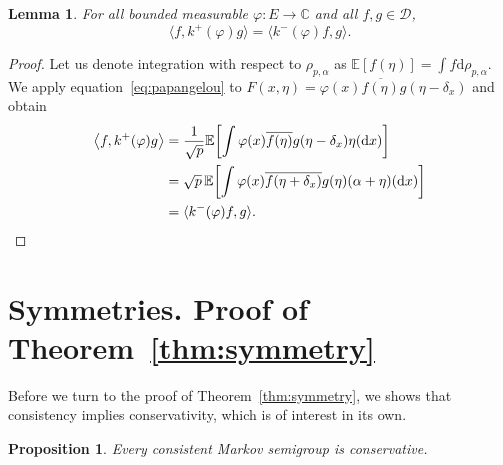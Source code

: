 \documentclass[pdftex]{sigma}
\numberwithin{equation}{section}
\newtheorem{Lemma}[Theorem]{Lemma}
\newtheorem{Proposition}[Theorem]{Proposition}
 { \theoremstyle{definition}
\newtheorem{Definition}[Theorem]{Definition}
\newtheorem{Example}[Theorem]{Example}
\newtheorem{Remark}[Theorem]{Remark}
}
\newcommand{\C}{\mathbb{C}}
\newcommand{\E}{\mathbb{E}}
\newcommand{\dd}{\mathrm{d}} %
\newcommand{\1}{\mathbbm{1}}
\begin{document}
\begin{Lemma} \label{lem:adjoints}
	For all bounded measurable $\varphi\colon E\to \C$ and all $f,g\in \mathcal D$,
	\[
		\bigl\langle f, k^+(\varphi) g\bigr\rangle = \langle k^-(\varphi) f,g \rangle.
	\]
\end{Lemma}

\begin{proof}	
	Let us denote integration with respect to $\rho_{p,\alpha}$ as $\E[f(\eta)] =\int f\dd \rho_{p,\alpha}$. We apply equation~\eqref{eq:papangelou} to $F(x,\eta) = \varphi(x) \overline{f(\eta)} g(\eta - \delta_x)$ and obtain
	\begin{align*}
		\bigl\langle f, k^+(\varphi) g \bigr\rangle
			& = \frac 1{\sqrt p} \E\biggl[\int \varphi(x) \overline{f(\eta)} g(\eta - \delta_x) \eta(\dd x)\biggr]\\
			& = \sqrt p\, \E\biggl[\int \varphi(x) \overline{f(\eta + \delta_x)} g(\eta) (\alpha+ \eta)(\dd x)\biggr]\\
			& = \langle k^-(\varphi) f,g \rangle. \qedhere
\tag*{\qed}
\end{align*}
\renewcommand{\qed}{}
\end{proof}

\section{Symmetries. Proof of Theorem~\ref{thm:symmetry}} \label{sec:symmetry}

Before we turn to the proof of Theorem~\ref{thm:symmetry}, we shows that consistency implies conservativity, which is of interest in its own.

\begin{Proposition}
 \label{proposition: consistency implies conservative}
	Every consistent Markov semigroup is conservative.
\end{Proposition}
\end{document}
